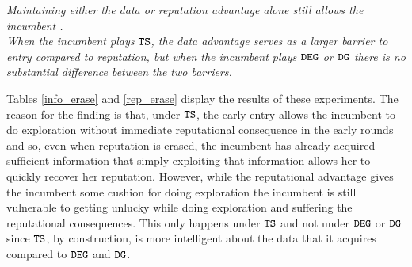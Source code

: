 \documentclass[../competing_bandits.tex]{subfiles}
\begin{document}
\begin{finding}
\textit{Maintaining either the data or reputation advantage alone still allows the incumbent .\\ \indent When the incumbent plays $\mathtt{TS}$, the data advantage serves as a larger barrier to entry compared to reputation, but when the incumbent plays $\mathtt{DEG}$ or $\mathtt{DG}$ there is no substantial difference between the two barriers.}
\end{finding}

Tables \ref{info_erase} and \ref{rep_erase} display the results of these experiments. The reason for the finding is that, under $\mathtt{TS}$, the early entry allows the incumbent to do exploration without immediate reputational consequence in the early rounds and so, even when reputation is erased, the incumbent has already acquired sufficient information that simply exploiting that information allows her to quickly recover her reputation. However, while the reputational advantage gives the incumbent some cushion for doing exploration the incumbent is still vulnerable to getting unlucky while doing exploration and suffering the reputational consequences. This only happens under $\mathtt{TS}$ and not under $\mathtt{DEG}$ or $\mathtt{DG}$ since $\mathtt{TS}$, by construction, is more intelligent about the data that it acquires compared to $\mathtt{DEG}$ and $\mathtt{DG}$.

\end{document}
